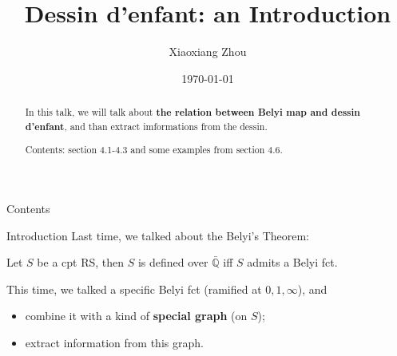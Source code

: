 \documentclass[pdf]{beamer}
\title{Dessin d'enfant: an Introduction}
\author{Xiaoxiang Zhou}
\institute[USTC]{University of Science and Technology of China}
\date{\today}
\numberwithin{equation}{section}
\theoremstyle{plain}
\theoremstyle{plain}
\theoremstyle{remark}
\begin{document}
\begin{frame}
	\titlepage
\end{frame}
\begin{frame}
\begin{abstract}
	In this talk, we will talk about \textbf{the relation between Belyi map and dessin d'enfant}, and than extract imformations from the dessin.
	
	Contents: section 4.1-4.3 and some examples from section 4.6.
\end{abstract}
\end{frame}
\begin{frame}{Contents}
\tableofcontents
\end{frame}


\begin{frame}{Introduction}
 Last time, we talked about the Belyi's Theorem:
\begin{theorem}[Thm 3.1]
	Let $S$ be a cpt RS, then $S$ is defined over $\bar{\mathbb{Q}}$ iff $S$ admits a Belyi fct.
\end{theorem}

This time, we talked a specific Belyi fct (ramified at $0,1,\infty$), and

\begin{itemize}
	\item combine it with a kind of \textbf{special graph} (on $S$);
	\item extract information from this graph.
\end{itemize}
\end{frame}
\end{document}
